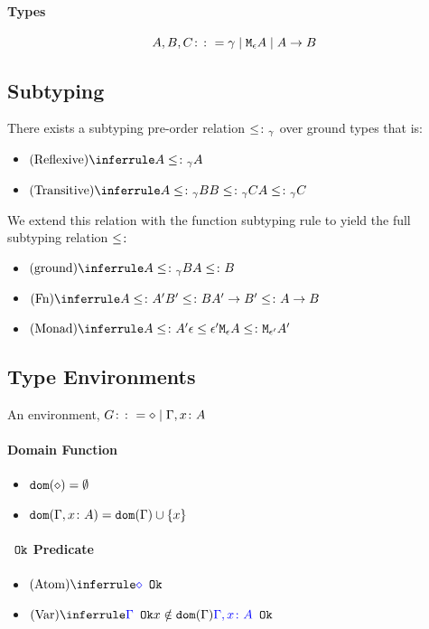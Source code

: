 \documentclass{report}
\begin{document}
    \paragraph{Types}
    $$ A, B, C \colon\colon= \gamma \mid \texttt{M}_{\epsilon}{A} \mid A\rightarrow B $$

\subsection{Subtyping}
    There exists a subtyping pre-order relation $\leq\colon_{\gamma}$ over ground types that is:
    \begin{itemize}
        \item $\ntreerulez{Reflexive}{A \subtype_{\ground} A}$
        \item $\ntreeruleII{Transitive}{A \subtype_{\ground} B }{ B \subtype_{\ground} C}{A \subtype_{\ground} C}$
    \end{itemize}

    We extend this relation with the function subtyping rule to yield the full subtyping relation $\leq\colon$

    \begin{itemize}
        \item $\ntreeruleI{ground}{A \subtype_{\ground} B}{A \subtype B}$
        \item $\ntreeruleII{Fn}{A \subtype A' }{ B' \subtype B }{\fntype{A'}{B'} \subtype \ab}$
        \item $\ntreeruleII{Monad}{A\subtype A'}{\e\subeffect\e'}{\mea\subtype\M{\e'}{A'}}$
    \end{itemize}
\subsection{Type Environments}
An environment, $G \colon\colon= \diamond \mid \Gamma, x\colon A$ 
\paragraph{Domain Function}
\begin{itemize}
    \item $\texttt{dom}(\diamond) = \emptyset$
    \item $\texttt{dom}(\Gamma, x\colon A) =  \texttt{dom}(\Gamma)  \cup \left\{x \right\}$
\end{itemize}
\paragraph{${\color{blue} } \texttt{ Ok}$ Predicate}
\begin{itemize}
    \item $\ntreerulez{Atom}{\ok{\nil}}$
    \item $\ntreeruleI{Var}{\ok{\G} }{ x\notin \dom{\G}}{\ok{\gax}}$
\end{itemize}
\end{document}
